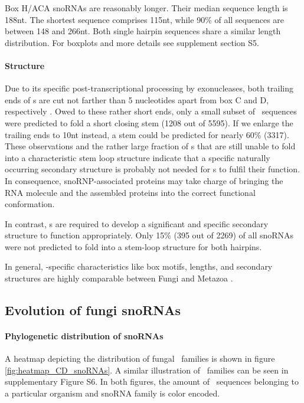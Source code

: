 Box H/ACA snoRNAs are reasonably longer. Their median sequence length
is 188nt. The shortest sequence comprises 115nt, while 90\% of all
sequences are between 148 and 266nt.  Both single hairpin
sequences share a similar length distribution. For boxplots and more details see supplement section S5.


\paragraph{\textbf{Structure}} Due to its specific
post-transcriptional processing by exonucleases, both trailing ends of
\cd s are cut not farther than 5 nucleotides apart from box C and D,
respectively \citep{Kishore:2013}. Owed to these rather short ends,
only a small subset of \sno\ sequences were predicted to fold a short
closing stem (1208 out of 5595).  If we enlarge the trailing ends to
10nt instead, a stem could be predicted for nearly 60\% (3317).  These
observations and the rather large fraction of \sno s that are still
unable to fold into a characteristic stem loop structure indicate that
a specific naturally occurring secondary structure is probably not
needed for \cd s to fulfil their function.  In consequence,
snoRNP-associated proteins may take charge of bringing the RNA
molecule and the assembled proteins into the correct functional
conformation.

In contrast, \haca s are required to develop a significant and
specific secondary structure to function appropriately. Only 15\% (395
out of 2269) of all snoRNAs were not predicted to fold into a
stem-loop structure for both hairpins.

In general, \sno -specific characteristics like box motifs, lengths,
and secondary structures are highly comparable between Fungi and
Metazoa \cite{Kehr:2014}.


\subsection{Evolution of fungi snoRNAs}
  
\paragraph{\textbf{Phylogenetic distribution of snoRNAs}}
A heatmap depicting the distribution of fungal \cd\ families is shown
in figure \ref{fig:heatmap_CD_snoRNAs}. A similar illustration of
\haca\ families can be seen in supplementary Figure S6. In both
figures, the amount of \sno\ sequences belonging to a particular
organism and snoRNA family is color encoded.

